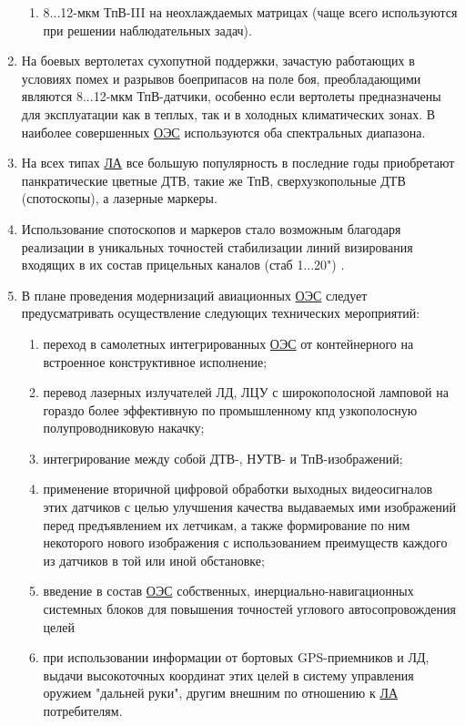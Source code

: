 \begin{enumerate}
\begin{enumerate}
		
		\item 8...12-мкм ТпВ-III на неохлаждаемых матрицах (чаще всего используются при решении наблюдательных задач).
	\end{enumerate}
	\item На боевых вертолетах сухопутной поддержки, зачастую работающих в условиях помех и разрывов боеприпасов на поле боя, преобладающими являются 8...12-мкм ТпВ-датчики, особенно если вертолеты предназначены для эксплуатации как в теплых, так и в холодных климатических зонах. В наиболее совершенных  \hyperref[acroEOS]{ОЭС} используются оба спектральных диапазона. 
	\item На всех типах  \hyperref[acroLA]{ЛА} все большую популярность в последние годы приобретают панкратические цветные ДТВ, такие же ТпВ, сверхузкопольные ДТВ (спотоскопы), а лазерные маркеры. 
	\item Использование спотоскопов и маркеров стало возможным благодаря реализации в уникальных точностей стабилизации линий визирования входящих в их состав прицельных каналов (стаб 1...20") .
	\item В плане проведения модернизаций авиационных  \hyperref[acroEOS]{ОЭС} следует предусматривать осуществление следующих технических мероприятий: 
	\begin{enumerate}
		\item переход в самолетных интегрированных  \hyperref[acroEOS]{ОЭС} от контейнерного на встроенное конструктивное исполнение; 
		\item перевод лазерных излучателей ЛД, ЛЦУ с широкополосной ламповой на гораздо более эффективную по промышленному кпд узкополосную полупроводниковую накачку; 
		\item интегрирование между собой ДТВ-, НУТВ- и ТпВ-изображений; 
		\item применение вторичной цифровой обработки выходных видеосигналов этих датчиков с целью улучшения качества выдаваемых ими изображений перед предъявлением их летчикам, а также формирование по ним некоторого нового изображения с использованием преимуществ каждого из датчиков в той или иной обстановке; 
		\item введение в состав  \hyperref[acroEOS]{ОЭС} собственных, инерциально-навигационных системных блоков для повышения точностей углового автосопровождения целей
		\item при использовании информации от бортовых GPS-приемников и ЛД, выдачи высокоточных координат этих целей в систему управления оружием "дальней руки", другим внешним по отношению к  \hyperref[acroLA]{ЛА} потребителям. 
	\end{enumerate}
\end{enumerate}

